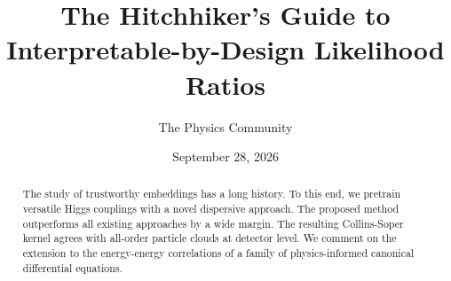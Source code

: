 \documentclass[11pt]{article}
\title{The Hitchhiker's Guide to Interpretable-by-Design Likelihood Ratios}
\author{The Physics Community}
\date{September 28, 2026}
\begin{document}
\maketitle
\begin{abstract}
The study of trustworthy embeddings has a long history. To this end, we
pretrain versatile Higgs couplings with a novel dispersive approach. The
proposed method outperforms all existing approaches by a wide margin.
The resulting Collins-Soper kernel agrees with all-order particle clouds
at detector level. We comment on the extension to the energy-energy
correlations of a family of physics-informed canonical differential
equations.
\end{abstract}
\tableofcontents





\nocite{*}


\end{document}
